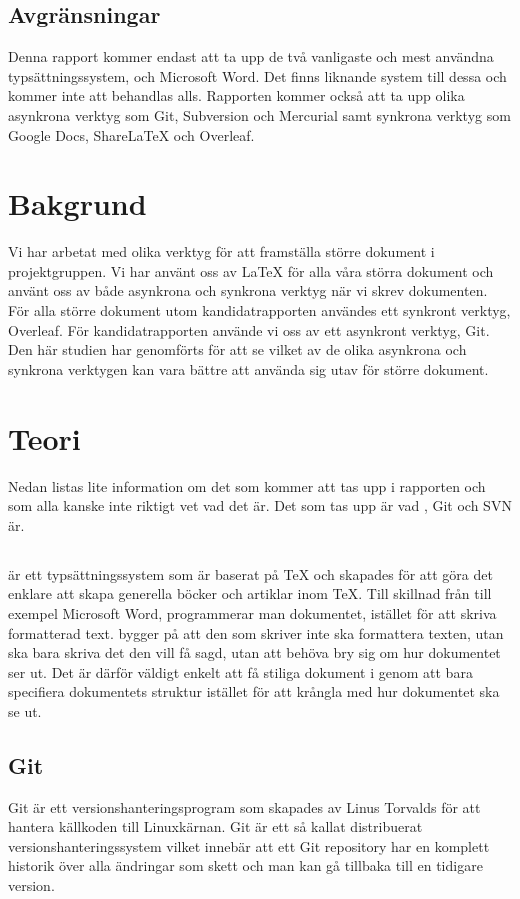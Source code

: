 \subsection{Avgränsningar}
Denna rapport kommer endast att ta upp de två vanligaste och mest användna typsättningssystem, \latex och Microsoft Word. Det finns liknande system till dessa och kommer inte att behandlas alls. Rapporten kommer också att ta upp olika asynkrona verktyg som Git, Subversion och Mercurial samt synkrona verktyg som Google Docs, ShareLaTeX och Overleaf.

\section{Bakgrund}
\label{sec:background-tuhkala}
Vi har arbetat med olika verktyg för att framställa större dokument i projektgruppen. Vi har använt oss av LaTeX för alla våra störra dokument och använt oss av både asynkrona och synkrona verktyg när vi skrev dokumenten. För alla större dokument utom kandidatrapporten användes ett synkront verktyg, Overleaf. För kandidatrapporten använde vi oss av ett asynkront verktyg, Git. Den här studien har genomförts för att se vilket av de olika asynkrona och synkrona verktygen kan vara bättre att använda sig utav för större dokument. 

\section{Teori}
\label{sec:theory-tuhkala}
Nedan listas lite information om det som kommer att tas upp i rapporten och som alla kanske inte riktigt vet vad det är. Det som tas upp är vad \latex, Git och SVN är.

\subsection{\latex}
\latex är ett typsättningssystem som är baserat på TeX och skapades för att göra det enklare att skapa generella böcker och artiklar inom TeX. Till skillnad från till exempel Microsoft Word, programmerar man dokumentet, istället för att skriva formatterad text. \latex bygger på att den som skriver inte ska formattera texten, utan ska bara skriva det den vill få sagd, utan att behöva bry sig om hur dokumentet ser ut.  Det är därför väldigt enkelt att få stiliga dokument i \latex genom att bara specifiera dokumentets struktur istället för att krångla med hur dokumentet ska se ut.

\subsection{Git}
Git är ett versionshanteringsprogram som skapades av Linus Torvalds för att hantera källkoden till Linuxkärnan. Git är ett så kallat distribuerat versionshanteringssystem vilket innebär att ett Git repository har en komplett historik över alla ändringar som skett och man kan gå tillbaka till en tidigare version.


